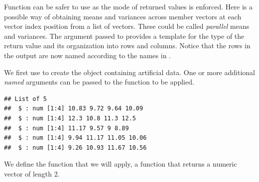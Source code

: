 \documentclass[krantz2]{krantz}\usepackage{knitr}%
\begin{document}
\begin{explainbox}
Function  can be safer to use as the mode of returned values is enforced. Here is a possible way of obtaining means and variances across member vectors at each vector index position from a list of vectors. These could be called \emph{parallel} means and variances. The argument passed to  provides a template for the type of the return value and its organization into rows and columns. Notice that the rows in the output are now named according to the names in .

We first use  to create the object  containing artificial data. One or more additional \emph{named} arguments can be passed to the function to be applied.

\begin{knitrout}\footnotesize
{}\color{fgcolor}\begin{kframe}
\begin{alltt}
\hlstd{(}\hlstd{)}
 \hlkwb{<-} \hlstd{(}\hlstd{(}\hlstd{,}   \hlstd{=} \hlstd{,}  \hlstd{=} \hlstd{)}
\end{alltt}
\begin{verbatim}
## List of 5
##  $ : num [1:4] 10.83 9.72 9.64 10.09
##  $ : num [1:4] 12.3 10.8 11.3 12.5
##  $ : num [1:4] 11.17 9.57 9 8.89
##  $ : num [1:4] 9.94 11.17 11.05 10.06
##  $ : num [1:4] 9.26 10.93 11.67 10.56
\end{verbatim}
\end{kframe}
\end{knitrout}

We define the function that we will apply, a function that returns a numeric vector of length 2.

\begin{knitrout}\footnotesize
{}\color{fgcolor}\begin{kframe}
\begin{alltt}
 \hlkwb{<-} \hlstd{(}\hlstd{,}  \hlstd{=} \hlstd{) \{}
       \hlstd{(}      
    \hlstd{\}}
\end{alltt}
\end{kframe}
\end{knitrout}


\end{explainbox}
\end{document}
